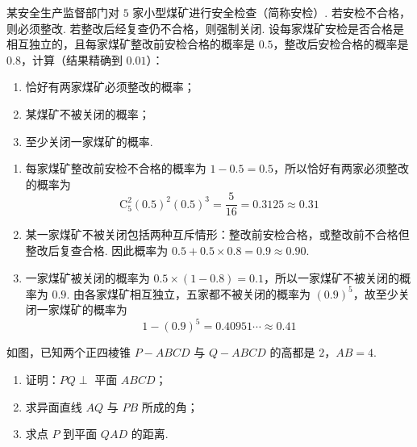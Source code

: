 \begin{problem}
某安全生产监督部门对 \(5\text{ 家}\)小型煤矿进行安全检查（简称安检）. 若安检不合格，则必须整改. 若整改后经复查仍不合格，则强制关闭. 设每家煤矿安检是否合格是相互独立的，且每家煤矿整改前安检合格的概率是 \(0.5\)，整改后安检合格的概率是 \(0.8\)，计算（结果精确到 \(0.01\)）：

\begin{enumerate}
\item 恰好有两家煤矿必须整改的概率；
\item 某煤矿不被关闭的概率；
\item 至少关闭一家煤矿的概率.
\end{enumerate}
\end{problem}

\begin{solution}
\begin{enumerate}
\item 每家煤矿整改前安检不合格的概率为 \(1-0.5=0.5\)，所以恰好有两家必须整改的概率为
\[
\mathrm C_5^2(0.5)^2(0.5)^3=\frac{5}{16}=0.3125\approx0.31
\]
\item 某一家煤矿不被关闭包括两种互斥情形：整改前安检合格，或整改前不合格但整改后复查合格. 因此概率为 \(0.5+0.5\times0.8=0.9\approx0.90\).
\item 一家煤矿被关闭的概率为 \(0.5\times(1-0.8)=0.1\)，所以一家煤矿不被关闭的概率为 \(0.9\). 由各家煤矿相互独立，五家都不被关闭的概率为 \((0.9)^5\)，故至少关闭一家煤矿的概率为
\[
1-(0.9)^5=0.40951\cdots\approx0.41
\]
\end{enumerate}
\end{solution}

\begin{problem}
如图，已知两个正四棱锥 \(P-ABCD\) 与 \(Q-ABCD\) 的高都是 \(2\)，\(AB=4\).

\begin{enumerate}
\item 证明：\(PQ\perp\) 平面 \(ABCD\)；
\item 求异面直线 \(AQ\) 与 \(PB\) 所成的角；
\item 求点 \(P\) 到平面 \(QAD\) 的距离.
\end{enumerate}

\end{problem}

